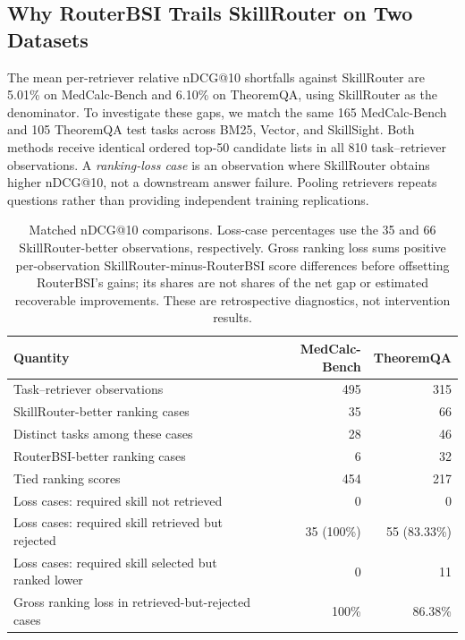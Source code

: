 \subsection{Why RouterBSI Trails SkillRouter on Two Datasets}
\label{app:routing-gap}
The mean per-retriever relative nDCG@10 shortfalls against SkillRouter are 5.01\% on MedCalc-Bench and 6.10\% on TheoremQA, using SkillRouter as the denominator. To investigate these gaps, we match the same 165 MedCalc-Bench and 105 TheoremQA test tasks across BM25, Vector, and SkillSight. Both methods receive identical ordered top-50 candidate lists in all 810 task--retriever observations. A \emph{ranking-loss case} is an observation where SkillRouter obtains higher nDCG@10, not a downstream answer failure. Pooling retrievers repeats questions rather than providing independent training replications.

\begin{table}[t]
\centering
\small
\begin{tabular}{lrr}
\toprule
Quantity & MedCalc-Bench & TheoremQA \\
\midrule
Task--retriever observations & 495 & 315 \\
SkillRouter-better ranking cases & 35 & 66 \\
Distinct tasks among these cases & 28 & 46 \\
RouterBSI-better ranking cases & 6 & 32 \\
Tied ranking scores & 454 & 217 \\
Loss cases: required skill not retrieved & 0 & 0 \\
Loss cases: required skill retrieved but rejected & 35 (100\%) & 55 (83.33\%) \\
Loss cases: required skill selected but ranked lower & 0 & 11 \\
Gross ranking loss in retrieved-but-rejected cases & 100\% & 86.38\% \\
\bottomrule
\end{tabular}
\caption{Matched nDCG@10 comparisons. Loss-case percentages use the 35 and 66 SkillRouter-better observations, respectively. Gross ranking loss sums positive per-observation SkillRouter-minus-RouterBSI score differences before offsetting RouterBSI's gains; its shares are not shares of the net gap or estimated recoverable improvements. These are retrospective diagnostics, not intervention results.}
\label{tab:app-routing-gap}
\end{table}

